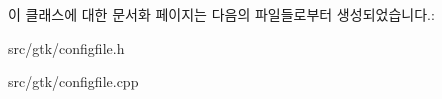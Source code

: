 이 클래스에 대한 문서화 페이지는 다음의 파일들로부터 생성되었습니다.\+:\begin{DoxyCompactItemize}
\item 
src/gtk/configfile.\+h\item 
src/gtk/configfile.\+cpp\end{DoxyCompactItemize}
